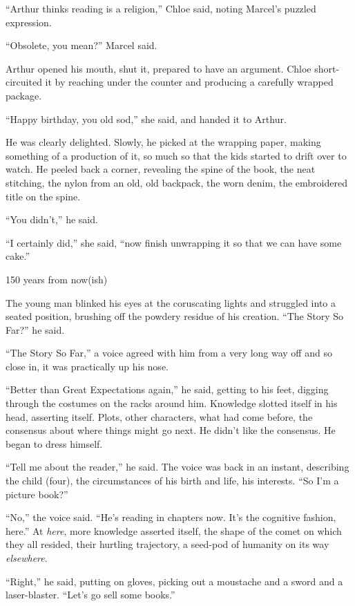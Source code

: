 “Arthur thinks reading is a religion,” Chloe said, noting Marcel's 
puzzled expression.

“Obsolete, you mean?” Marcel said.

Arthur opened his mouth, shut it, prepared to have an argument. Chloe 
short-circuited it by reaching under the counter and producing a 
carefully wrapped package.

“Happy birthday, you old sod,” she said, and handed it to Arthur.

He was clearly delighted. Slowly, he picked at the wrapping paper, 
making something of a production of it, so much so that the kids 
started to drift over to watch. He peeled back a corner, revealing the 
spine of the book, the neat stitching, the nylon from an old, old 
backpack, the worn denim, the embroidered title on the spine.

“You didn't,” he said.

“I certainly did,” she said, “now finish unwrapping it so that we 
can have some cake.”

\tb

150 years from now(ish)

The young man blinked his eyes at the coruscating lights and struggled 
into a seated position, brushing off the powdery residue of his 
creation. “The Story So Far?” he said.

“The Story So Far,” a voice agreed with him from a very long way 
off and so close in, it was practically up his nose.

“Better than Great Expectations again,” he said, getting to his 
feet, digging through the costumes on the racks around him. Knowledge 
slotted itself in his head, asserting itself. Plots, other characters, 
what had come before, the consensus about where things might go next. 
He didn't like the consensus. He began to dress himself.

“Tell me about the reader,” he said. The voice was back in an 
instant, describing the child (four), the circumstances of his birth 
and life, his interests. “So I'm a picture book?”

“No,” the voice said. “He's reading in chapters now. It's the 
cognitive fashion, here.” At \emph{here}, more knowledge asserted 
itself, the shape of the comet on which they all resided, their 
hurtling trajectory, a seed-pod of humanity on its way \emph{elsewhere}.

“Right,” he said, putting on gloves, picking out a moustache and a 
sword and a laser-blaster. “Let's go sell some books.”

